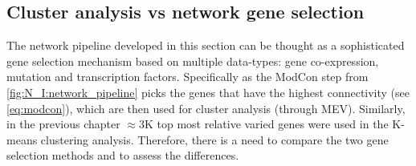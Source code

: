 



\subsection{Cluster analysis vs network gene selection} \label{s:N_I:cs_vs_gene_sel}

The network pipeline developed in this section can be thought as a sophisticated gene selection mechanism based on multiple data-types: gene co-expression, mutation and transcription factors. Specifically as the ModCon step from  \cref{fig:N_I:network_pipeline} picks the genes that have the highest connectivity (see \cref{eq:modcon}), which are then used for cluster analysis (through MEV). Similarly, in the previous chapter $\approx$3K top most relative varied genes were used in the K-means clustering analysis. Therefore, there is a need to compare the two gene selection methods and to assess the differences.

